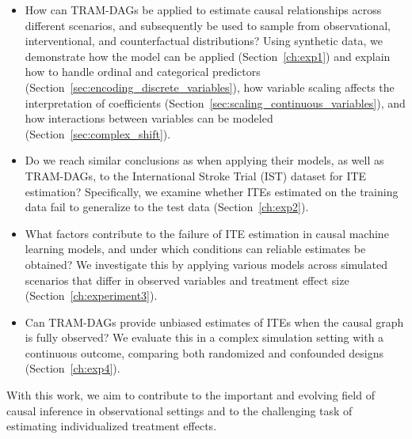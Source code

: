 \begin{itemize}
    \item How can TRAM-DAGs be applied to estimate causal relationships across different scenarios, and subsequently be used to sample from observational, interventional, and counterfactual distributions? Using synthetic data, we demonstrate how the model can be applied (Section~\ref{ch:exp1}) and explain how to handle ordinal and categorical predictors (Section~\ref{sec:encoding_discrete_variables}), how variable scaling affects the interpretation of coefficients (Section~\ref{sec:scaling_continuous_variables}), and how interactions between variables can be modeled (Section~\ref{sec:complex_shift}).

    
    \item Do we reach similar conclusions as \citet{chen2025} when applying their models, as well as TRAM-DAGs, to the International Stroke Trial (IST) dataset for ITE estimation? Specifically, we examine whether ITEs estimated on the training data fail to generalize to the test data (Section~\ref{ch:exp2}).

    \item What factors contribute to the failure of ITE estimation in causal machine learning models, and under which conditions can reliable estimates be obtained? We investigate this by applying various models across simulated scenarios that differ in observed variables and treatment effect size (Section~\ref{ch:experiment3}).

    \item Can TRAM-DAGs provide unbiased estimates of ITEs when the causal graph is fully observed? We evaluate this in a complex simulation setting with a continuous outcome, comparing both randomized and confounded designs (Section~\ref{ch:exp4}).
\end{itemize}




% 



With this work, we aim to contribute to the important and evolving field of causal inference in observational settings and to the challenging task of estimating individualized treatment effects.
